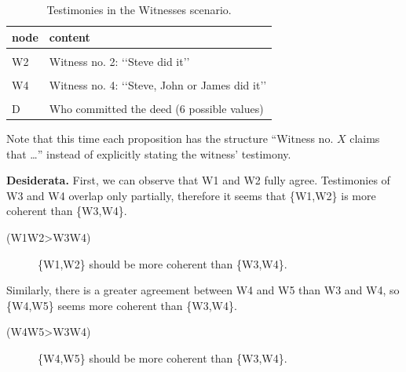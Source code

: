 \documentclass[
  10pt,
]{scrartcl}
\newcommand{\s}[1]{\textsf{#1}}
\begin{document}
\begin{table}[H]

\caption{\label{tab:witnessesProp}Testimonies in the Witnesses scenario.}
\centering
\begin{tabular}[t]{ll}
\toprule
node & content\\
\midrule
\cellcolor{gray!6}{W1} & \cellcolor{gray!6}{Witness no. 1: ‘‘Steve did it’’}\\
W2 & Witness no. 2: ‘‘Steve did it’’\\
\cellcolor{gray!6}{W3} & \cellcolor{gray!6}{Witness no. 3: ‘‘Steve, Martin or David did it’’}\\
W4 & Witness no. 4: ‘‘Steve, John or James did it’’\\
\cellcolor{gray!6}{W5} & \cellcolor{gray!6}{Wittness no. 5: ‘‘Steve, John or Peter did it’’}\\
D & Who committed the deed (6  possible values)\\
\bottomrule
\end{tabular}
\end{table}

\noindent Note that this time each proposition has the structure ``Witness no. \(X\) claims that \dots'' instead of explicitly stating the witness' testimony.

\textbf{Desiderata.} First, we can observe that \s{W1} and \s{W2} fully agree. Testimonies of \s{W3} and \s{W4} overlap only partially, therefore it seems that \{\s{W1},\s{W2}\} is more coherent than \{\s{W3},\s{W4}\}.
\vspace{2mm}

\begin{description}
    \item[(\s{W1W2\textgreater W3W4})] \{\s{W1},\s{W2}\} should be more coherent than \{\s{W3},\s{W4}\}.
\end{description}\vspace{2mm}

Similarly, there is a greater agreement between \s{W4} and \s{W5} than \s{W3} and \s{W4}, so \{\s{W4},\s{W5}\} seems more coherent than \{\s{W3},\s{W4}\}.
\vspace{2mm}

\begin{description}
    \item[(\s{W4W5\textgreater W3W4})] \{\s{W4},\s{W5}\} should be more coherent than \{\s{W3},\s{W4}\}.
\end{description}\vspace{2mm}
\end{document}
